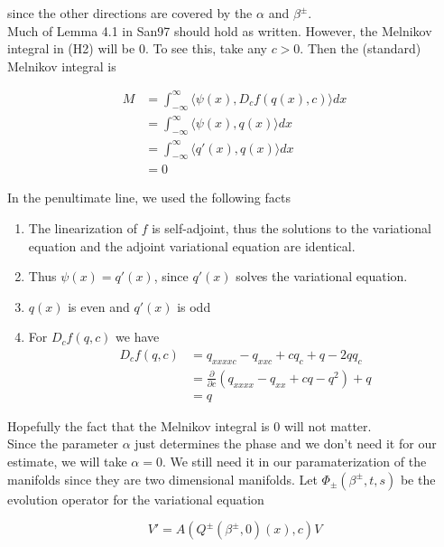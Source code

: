\documentclass[12pt]{article}
\begin{document}
since the other directions are covered by the $\alpha$ and $\beta^\pm$.\\

Much of Lemma 4.1 in San97 should hold as written. However, the Melnikov integral in (H2) will be 0. To see this, take any $c > 0$. Then the (standard) Melnikov integral is

\begin{align*}
M &= \int_{-\infty}^\infty \langle \psi(x), D_c f(q(x), c) \rangle dx \\
&= \int_{-\infty}^\infty \langle \psi(x), q(x) \rangle dx \\
&= \int_{-\infty}^\infty \langle q'(x), q(x) \rangle dx \\
&= 0
\end{align*}

In the penultimate line, we used the following facts

\begin{enumerate}

\item The linearization of $f$ is self-adjoint, thus the solutions to the variational equation and the adjoint variational equation are identical.
\item Thus $\psi(x) = q'(x)$, since $q'(x)$ solves the variational equation.
\item $q(x)$ is even and $q'(x)$ is odd
\item For $D_c f(q, c)$ we have
\begin{align*}
D_c f(q, c) &= q_{xxxxc} - q_{xxc} + c q_c + q - 2qq_c \\
&= \frac{\partial}{\partial c}(q_{xxxx} - q_{xx} + cq - q^2) + q \\
&= q
\end{align*}

\end{enumerate}

Hopefully the fact that the Melnikov integral is 0 will not matter.\\

Since the parameter $\alpha$ just determines the phase and we don't need it for our estimate, we will take $\alpha = 0$. We still need it in our paramaterization of the manifolds since they are two dimensional manifolds. Let $\Phi_\pm(\beta^\pm, t, s)$ be the evolution operator for the variational equation

\begin{equation}
V' = A(Q^\pm(\beta^\pm, 0)(x), c) V
\end{equation}
\end{document}

